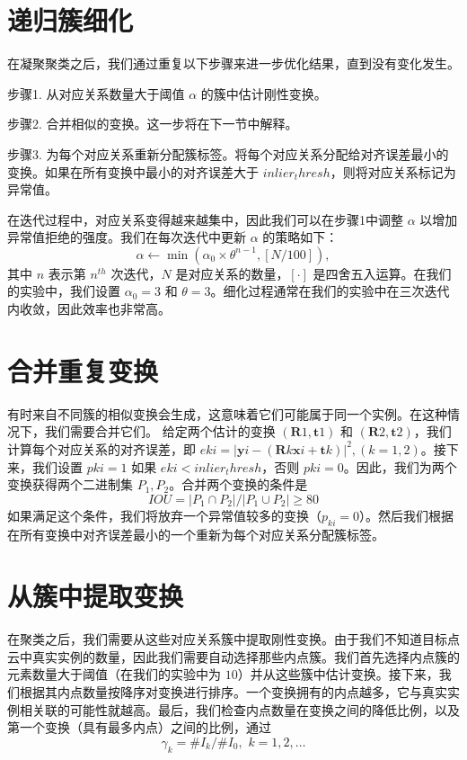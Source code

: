 \section{递归簇细化} \label{sec:cluster_refinement}
在凝聚聚类之后，我们通过重复以下步骤来进一步优化结果，直到没有变化发生。

步骤1. 从对应关系数量大于阈值 $\alpha$ 的簇中估计刚性变换。

步骤2. 合并相似的变换。这一步将在下一节中解释。

步骤3. 为每个对应关系重新分配簇标签。将每个对应关系分配给对齐误差最小的变换。如果在所有变换中最小的对齐误差大于 $inlier_thresh$，则将对应关系标记为异常值。

在迭代过程中，对应关系变得越来越集中，因此我们可以在步骤1中调整 $\alpha$ 以增加异常值拒绝的强度。我们在每次迭代中更新 $\alpha$ 的策略如下：
\begin{equation}
\alpha \leftarrow \min(\alpha _0\times \theta ^{n-1},\left[N/100 \right] ),
\label{eq:alpha}
\end{equation}
其中 $n$ 表示第 $n^{th}$ 次迭代，$N$ 是对应关系的数量，$\left[ \cdot \right]$ 是四舍五入运算。在我们的实验中，我们设置 $\alpha_0 = 3$ 和 $\theta = 3$。细化过程通常在我们的实验中在三次迭代内收敛，因此效率也非常高。

\section{合并重复变换}
有时来自不同簇的相似变换会生成，这意味着它们可能属于同一个实例。在这种情况下，我们需要合并它们。
给定两个估计的变换 $(\mathbf{R}1, \mathbf{t}1)$ 和 $(\mathbf{R}2, \mathbf{t}2)$，我们计算每个对应关系的对齐误差，即 $e{ki} = |\mathbf{y}{i}-(\mathbf{R}k \mathbf{x}{i} + \mathbf{t}k)|^2, (k = 1,2)$。接下来，我们设置 $p{ki} = 1$ 如果 $e{ki} < inlier_thresh$，否则 $p{ki}=0$。因此，我们为两个变换获得两个二进制集 $P_1, P_2$。合并两个变换的条件是
\begin{equation}
IOU = |P_1 \cap P_2|/|P_1 \cup P_2| \geq 80%
\label{eq:iou}
\end{equation}
如果满足这个条件，我们将放弃一个异常值较多的变换（$p_{ki} = 0$）。然后我们根据在所有变换中对齐误差最小的一个重新为每个对应关系分配簇标签。

\section{从簇中提取变换}

在聚类之后，我们需要从这些对应关系簇中提取刚性变换。由于我们不知道目标点云中真实实例的数量，因此我们需要自动选择那些内点簇。我们首先选择内点簇的元素数量大于阈值（在我们的实验中为 $10$）并从这些簇中估计变换。接下来，我们根据其内点数量按降序对变换进行排序。一个变换拥有的内点越多，它与真实实例相关联的可能性就越高。最后，我们检查内点数量在变换之间的降低比例，以及第一个变换（具有最多内点）之间的比例，通过
\begin{equation}
    \gamma_k = \#I_{k}/\#I_{0},\,\, k = 1,2,\ldots
\end{equation}

